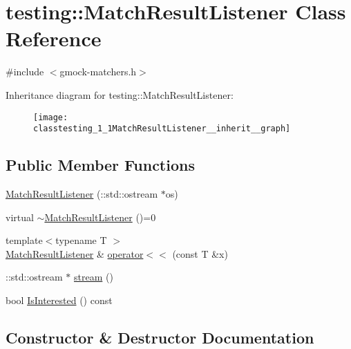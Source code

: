 \hypertarget{classtesting_1_1MatchResultListener}{}\section{testing\+:\+:Match\+Result\+Listener Class Reference}
\label{classtesting_1_1MatchResultListener}


{\ttfamily \#include $<$gmock-\/matchers.\+h$>$}



Inheritance diagram for testing\+:\+:Match\+Result\+Listener\+:
\nopagebreak
\begin{figure}[H]
\begin{center}
\leavevmode
\texttt{[image: classtesting\_1\_1MatchResultListener\_\_inherit\_\_graph]}
\end{center}
\end{figure}
\subsection*{Public Member Functions}
\begin{DoxyCompactItemize}
\item 
\hyperlink{classtesting_1_1MatchResultListener_a245c360286cd0496d22a4d2fde80eb0b}{Match\+Result\+Listener} (\+::std\+::ostream $\ast$os)
\item 
virtual \hyperlink{classtesting_1_1MatchResultListener_aa29f43f7b2ffd850c721a8a33ccbba92}{$\sim$\+Match\+Result\+Listener} ()=0
\item 
{\footnotesize template$<$typename T $>$ }\\\hyperlink{classtesting_1_1MatchResultListener}{Match\+Result\+Listener} \& \hyperlink{classtesting_1_1MatchResultListener_a89f628a452635d1502a9062d9c864ebd}{operator$<$$<$} (const T \&x)
\item 
\+::std\+::ostream $\ast$ \hyperlink{classtesting_1_1MatchResultListener_a5abecb247e005f7f50a94898e3f44ee3}{stream} ()
\item 
bool \hyperlink{classtesting_1_1MatchResultListener_a68dc4f2f3c3425f4d4dd90ab02244615}{Is\+Interested} () const 
\end{DoxyCompactItemize}


\subsection{Constructor \& Destructor Documentation}
